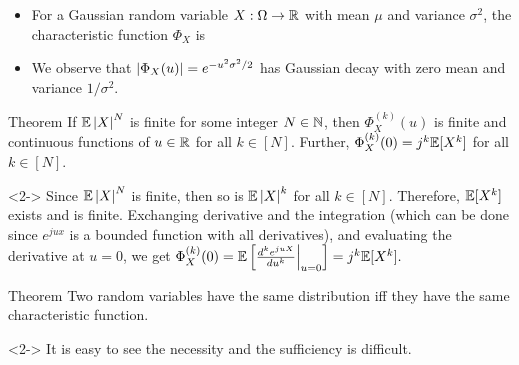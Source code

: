 \documentclass[12pt,aspectratio=169]{beamer}
\begin{document}
\begin{frame}
\begin{Example} 
\begin{itemize}
\item <1-> For a Gaussian random variable $X: \Omega \to \mathbb{R}$ with mean $\mu$ and variance $\sigma^2$, 
the characteristic function $\Phi_X$ is 
\item <2-> We observe that $\left\lvert\Phi_X(u)\right\rvert = e^{-u^2\sigma^2/2}$ has Gaussian decay with zero mean and variance $1/\sigma^2$. 
\end{itemize}
\end{Example}
\end{frame}

\begin{frame}
\begin{block}{Theorem}
If $\mathbb{E}\left\lvert X\right\rvert^N$ is finite for some integer $N \in \mathbb{N}$, 
then $\Phi_X^{(k)}(u)$ is finite and continuous functions of $u \in \mathbb{R}$ for all $k \in [N]$. 
Further, $\Phi_X^{(k)}(0) = j^k\mathbb{E}[X^k]$ for all $k \in [N]$.  
\end{block}

\begin{Proof}<2->
Since $\mathbb{E}\left\lvert X\right\rvert^N$ is finite, then so is $\mathbb{E}\left\lvert X\right\rvert^k$ for all $k\in [N]$. 
Therefore, $\mathbb{E}[X^k]$ exists and is finite. 
Exchanging derivative and the integration (which can be done since $e^{ju x}$ is a bounded function with all derivatives), 
and evaluating the derivative at $u=0$, we get 
$
\Phi_X^{(k)}(0) 
= \mathbb{E}\left[\frac{d^ke^{ju X}}{du^k}\Big\rvert_{u=0}\right]
= j^k\mathbb{E}[X^k].
$
\end{Proof}
\end{frame}

\begin{frame}

\begin{block}{Theorem} 
Two random variables have the same distribution iff they have the same characteristic function. 
\end{block}

\begin{Proof}<2->
It is easy to see the necessity and the sufficiency is difficult. 
\end{Proof}
\end{frame}
\end{document}
